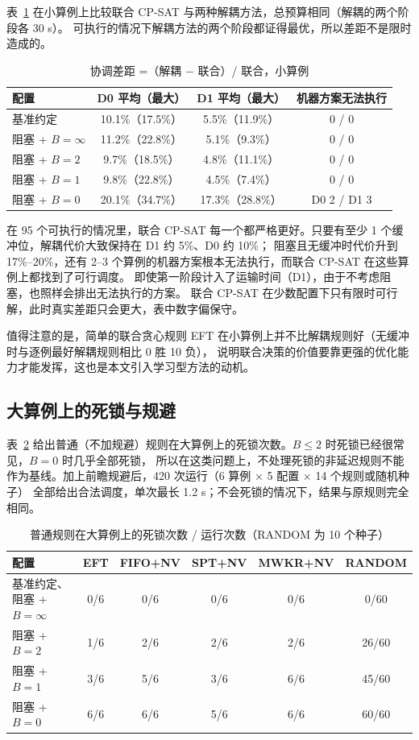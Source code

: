 \documentclass[11pt,a4paper]{ctexart}
\theoremstyle{definition}
\theoremstyle{remark}
\begin{document}
表~\ref{tab:decoupled} 在小算例上比较联合 CP-SAT 与两种解耦方法，总预算相同（解耦的两个阶段各 30 s）。
可执行的情况下解耦方法的两个阶段都证得最优，所以差距不是限时造成的。

\begin{table}[ht]
\centering
\caption{协调差距 =（解耦 $-$ 联合）/ 联合，小算例}
\label{tab:decoupled}
\small
\begin{tabular}{lccc}
\toprule
配置 & D0 平均（最大） & D1 平均（最大） & 机器方案无法执行 \\
\midrule
基准约定 & 10.1\%（17.5\%） & 5.5\%（11.9\%） & 0 / 0 \\
阻塞 + $B=\infty$ & 11.2\%（22.8\%） & 5.1\%（9.3\%） & 0 / 0 \\
阻塞 + $B=2$ & 9.7\%（18.5\%） & 4.8\%（11.1\%） & 0 / 0 \\
阻塞 + $B=1$ & 9.8\%（22.8\%） & 4.5\%（7.4\%） & 0 / 0 \\
阻塞 + $B=0$ & 20.1\%（34.7\%） & 17.3\%（28.8\%） & D0 2 / D1 3 \\
\bottomrule
\end{tabular}
\end{table}

在 95 个可执行的情况里，联合 CP-SAT 每一个都严格更好。只要有至少 1 个缓冲位，解耦代价大致保持在 D1 约 5\%、D0 约 10\%；
阻塞且无缓冲时代价升到 17\%--20\%，还有 2--3 个算例的机器方案根本无法执行，而联合 CP-SAT 在这些算例上都找到了可行调度。
即使第一阶段计入了运输时间（D1），由于不考虑阻塞，也照样会排出无法执行的方案。
联合 CP-SAT 在少数配置下只有限时可行解，此时真实差距只会更大，表中数字偏保守。

值得注意的是，简单的联合贪心规则 EFT 在小算例上并不比解耦规则好（无缓冲时与逐例最好解耦规则相比 0 胜 10 负），
说明联合决策的价值要靠更强的优化能力才能发挥，这也是本文引入学习型方法的动机。

\subsection{大算例上的死锁与规避}\label{sec:deadlock}

表~\ref{tab:deadlock} 给出普通（不加规避）规则在大算例上的死锁次数。$B\le2$ 时死锁已经很常见，$B=0$ 时几乎全部死锁，
所以在这类问题上，不处理死锁的非延迟规则不能作为基线。加上前瞻规避后，420 次运行（6 算例 × 5 配置 × 14 个规则或随机种子）
全部给出合法调度，单次最长 1.2 s；不会死锁的情况下，结果与原规则完全相同。

\begin{table}[ht]
\centering
\caption{普通规则在大算例上的死锁次数 / 运行次数（RANDOM 为 10 个种子）}
\label{tab:deadlock}
\small
\begin{tabular}{lccccc}
\toprule
配置 & EFT & FIFO+NV & SPT+NV & MWKR+NV & RANDOM \\
\midrule
基准约定、阻塞 + $B=\infty$ & 0/6 & 0/6 & 0/6 & 0/6 & 0/60 \\
阻塞 + $B=2$ & 1/6 & 2/6 & 2/6 & 2/6 & 26/60 \\
阻塞 + $B=1$ & 3/6 & 5/6 & 3/6 & 6/6 & 45/60 \\
阻塞 + $B=0$ & 6/6 & 6/6 & 5/6 & 6/6 & 60/60 \\
\bottomrule
\end{tabular}
\end{table}
\end{document}
